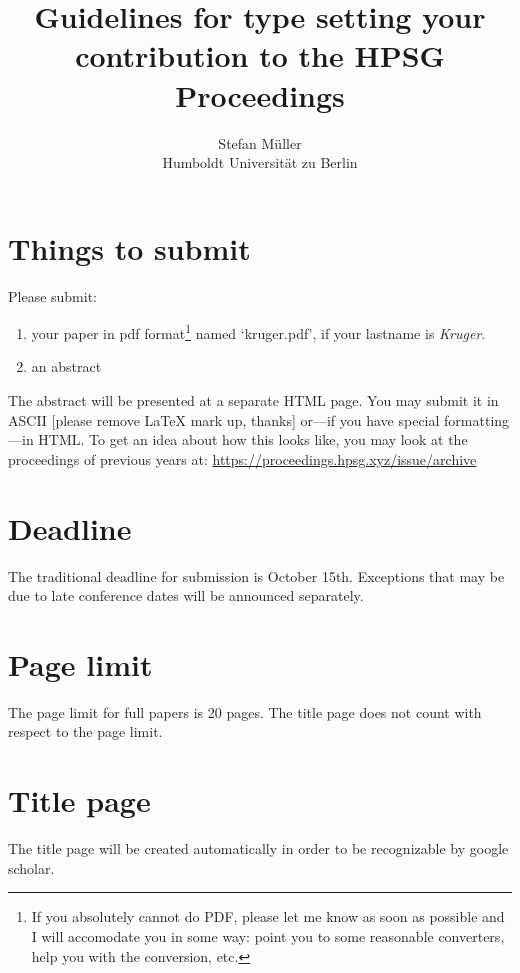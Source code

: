 \documentclass[11pt,a4paper,fleqn]{article}
\title{Guidelines for type setting your contribution to the HPSG Proceedings}
\author{Stefan Müller\\
Humboldt Universität zu Berlin}
\begin{document}
\maketitle


\section{Things to submit}

Please submit:
\begin{enumerate}
\item your paper in pdf format\footnote{
If you absolutely cannot do PDF, please let me know as soon as
possible and I will accomodate you in some way: point you to some
reasonable converters, help you with the conversion, etc.}
%
 named `kruger.pdf', if your lastname is \emph{Kruger}.



\item an abstract
\end{enumerate}
The abstract will be presented at a separate HTML page. You may submit it in ASCII [please remove \LaTeX{} mark up, thanks]
or---if you have special formatting---in HTML. 
To get an idea about how this looks like,
you may look at the proceedings of previous years at:\newline
\url{https://proceedings.hpsg.xyz/issue/archive}

\section{Deadline}

The traditional deadline for submission is October 15th. Exceptions that may be due to late
conference dates will be announced separately.

\section{Page limit}

The page limit for full papers is 20 pages. The title page does not count with respect to the page limit.


\section{Title page}


The title page will be created automatically in order to be recognizable by google scholar.
\end{document}
